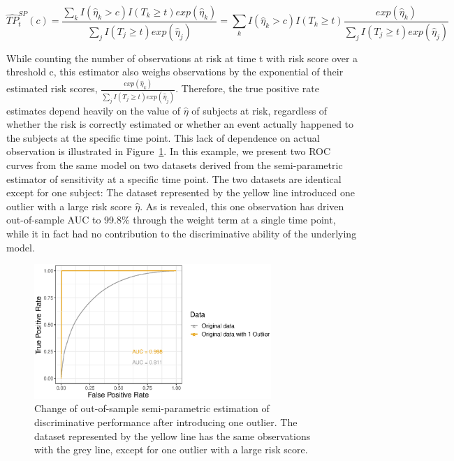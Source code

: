 \documentclass[useAMS,usenatbib, referee]{biom}
\begin{document}
\begin{equation}
\hat{TP}_t^{SP}(c) 
=\frac{\sum_{k}I(\hat{\eta}_k>c)I(T_k\geq t)exp(\hat{\eta}_k)}{\sum_{j}I(T_j\geq t)exp(\hat{\eta}_j)} =\sum_{k}I(\hat{\eta}_k>c)I(T_k\geq t)\frac{exp(\hat{\eta}_k)}{\sum_{j}I(T_j\geq t)exp(\hat{\eta}_j)} 
\label{eq-weight}
\end{equation}


While counting the number of observations at risk at time t with risk score over a threshold c, this estimator also weighs observations by the exponential of their estimated risk scores, $\frac{exp(\hat{\eta}_k)}{\sum_{j}I(T_j\geq t)exp(\hat{\eta}_j)}$. Therefore, the true positive rate estimates depend heavily on the value of $\hat{\eta}$ of subjects at risk, regardless of whether the risk is correctly estimated or whether an event actually happened to the subjects at the specific time point. This lack of dependence on actual observation is illustrated in Figure~\ref{fig-outlier}. In this example, we present two ROC curves from the same model on two datasets derived from the semi-parametric estimator of sensitivity at a specific time point. The two datasets are identical except for one subject: The dataset represented by the yellow line introduced one outlier with a large risk score $\hat{\eta}$. As is revealed, this one observation has driven out-of-sample AUC to 99.8\% through the weight term at a single time point, while it in fact had no contribution to the discriminative ability of the underlying model. 

\begin{figure}
\centerline{\includegraphics[width=0.8\textwidth]{outlier_exp.eps}}
\caption{Change of out-of-sample semi-parametric estimation of discriminative performance after introducing one outlier. The dataset represented by the yellow line has the same observations with the grey line, except for one outlier with a large risk score.}
\label{fig-outlier}
\end{figure}
\end{document}
